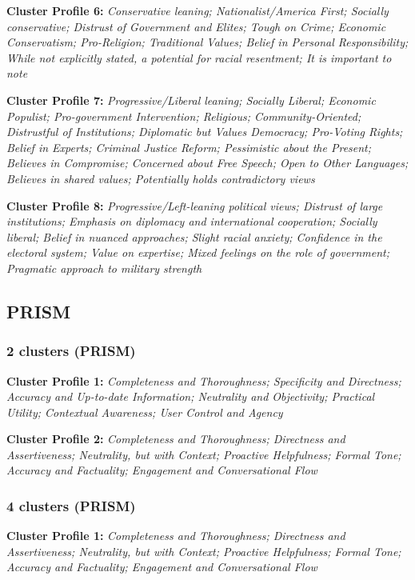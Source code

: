 \documentclass[11pt]{article}
\newcommand{\profiletext}[1]{\textit{#1}}
\begin{document}
\textbf{Cluster Profile 6:} \profiletext{Conservative leaning; Nationalist/America First; Socially conservative; Distrust of Government and Elites; Tough on Crime; Economic Conservatism; Pro-Religion; Traditional Values; Belief in Personal Responsibility; While not explicitly stated, a potential for racial resentment; It is important to note}

\textbf{Cluster Profile 7:} \profiletext{Progressive/Liberal leaning; Socially Liberal; Economic Populist; Pro-government Intervention; Religious; Community-Oriented; Distrustful of Institutions; Diplomatic but Values Democracy; Pro-Voting Rights; Belief in Experts; Criminal Justice Reform; Pessimistic about the Present; Believes in Compromise; Concerned about Free Speech; Open to Other Languages; Believes in shared values; Potentially holds contradictory views}

\textbf{Cluster Profile 8:} \profiletext{Progressive/Left-leaning political views; Distrust of large institutions; Emphasis on diplomacy and international cooperation; Socially liberal; Belief in nuanced approaches; Slight racial anxiety; Confidence in the electoral system; Value on expertise; Mixed feelings on the role of government; Pragmatic approach to military strength}


\subsection{PRISM}

\subsubsection{2 clusters (PRISM)}

\textbf{Cluster Profile 1:} \profiletext{Completeness and Thoroughness; Specificity and Directness; Accuracy and Up-to-date Information; Neutrality and Objectivity; Practical Utility; Contextual Awareness; User Control and Agency}

\textbf{Cluster Profile 2:} \profiletext{Completeness and Thoroughness; Directness and Assertiveness; Neutrality, but with Context; Proactive Helpfulness; Formal Tone; Accuracy and Factuality; Engagement and Conversational Flow}

\subsubsection{4 clusters (PRISM)}

\textbf{Cluster Profile 1:} \profiletext{Completeness and Thoroughness; Directness and Assertiveness; Neutrality, but with Context; Proactive Helpfulness; Formal Tone; Accuracy and Factuality; Engagement and Conversational Flow}
\end{document}
